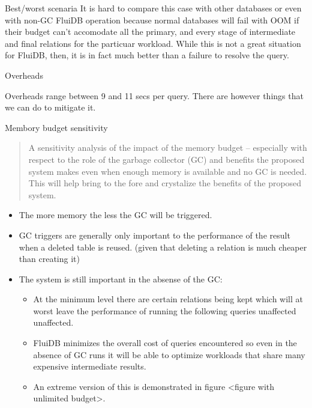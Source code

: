 \begin{contribution}{Best/worst scenaria}
It is hard to compare this case with other databases or even with
non-GC FluiDB operation because normal databases will fail with OOM if
their budget can't accomodate all the primary, and every stage of
intermediate and final relations for the particuar workload. While
this is not a great situation for FluiDB, then, it is in fact much
better than a failure to resolve the query.


\end{contribution}


\begin{contribution}{Overheads}

Overheads range between 9 and 11 secs per query. There are however
things that we can do to mitigate it.

\end{contribution}


\begin{contribution}{Membory budget sensitivity}

\begin{quote}
A sensitivity analysis of the impact of the memory budget –
especially with respect to the role of the garbage collector (GC)
and benefits the proposed system makes even when enough memory is
available and no GC is needed. This will help bring to the fore and
crystalize the benefits of the proposed system.
\end{quote}


\begin{itemize}
\item The more memory the less the GC will be triggered.
\item GC triggers are generally only important to the performance of the
  result when a deleted table is reused. (given that deleting a
  relation is much cheaper than creating it)
\item The system is still important in the absense of the GC:
  \begin{itemize}
  \item At the minimum level there are certain relations being kept which
    will at worst leave the performance of running the following
    queries unaffected unaffected.
  \item FluiDB minimizes the overall cost of queries encountered so even
    in the absence of GC runs it will be able to optimize workloads
    that share many expensive intermediate results.
  \item An extreme version of this is demonstrated in figure <figure with
    unlimited budget>.
  \end{itemize}
\end{itemize}


\end{contribution}

